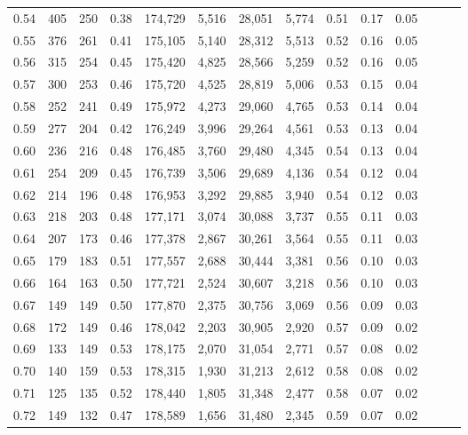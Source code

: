 \begin{tabular}{rrrrrrrrrrrrrr}
0.54 &    405 &  250 &  0.38 &  174,729 &    5,516 &  28,051 &   5,774 &  0.51 &  0.17 &      0.05 \\
0.55 &    376 &  261 &  0.41 &  175,105 &    5,140 &  28,312 &   5,513 &  0.52 &  0.16 &      0.05 \\
0.56 &    315 &  254 &  0.45 &  175,420 &    4,825 &  28,566 &   5,259 &  0.52 &  0.16 &      0.05 \\
0.57 &    300 &  253 &  0.46 &  175,720 &    4,525 &  28,819 &   5,006 &  0.53 &  0.15 &      0.04 \\
0.58 &    252 &  241 &  0.49 &  175,972 &    4,273 &  29,060 &   4,765 &  0.53 &  0.14 &      0.04 \\
0.59 &    277 &  204 &  0.42 &  176,249 &    3,996 &  29,264 &   4,561 &  0.53 &  0.13 &      0.04 \\
0.60 &    236 &  216 &  0.48 &  176,485 &    3,760 &  29,480 &   4,345 &  0.54 &  0.13 &      0.04 \\
0.61 &    254 &  209 &  0.45 &  176,739 &    3,506 &  29,689 &   4,136 &  0.54 &  0.12 &      0.04 \\
0.62 &    214 &  196 &  0.48 &  176,953 &    3,292 &  29,885 &   3,940 &  0.54 &  0.12 &      0.03 \\
0.63 &    218 &  203 &  0.48 &  177,171 &    3,074 &  30,088 &   3,737 &  0.55 &  0.11 &      0.03 \\
0.64 &    207 &  173 &  0.46 &  177,378 &    2,867 &  30,261 &   3,564 &  0.55 &  0.11 &      0.03 \\
0.65 &    179 &  183 &  0.51 &  177,557 &    2,688 &  30,444 &   3,381 &  0.56 &  0.10 &      0.03 \\
0.66 &    164 &  163 &  0.50 &  177,721 &    2,524 &  30,607 &   3,218 &  0.56 &  0.10 &      0.03 \\
0.67 &    149 &  149 &  0.50 &  177,870 &    2,375 &  30,756 &   3,069 &  0.56 &  0.09 &      0.03 \\
0.68 &    172 &  149 &  0.46 &  178,042 &    2,203 &  30,905 &   2,920 &  0.57 &  0.09 &      0.02 \\
0.69 &    133 &  149 &  0.53 &  178,175 &    2,070 &  31,054 &   2,771 &  0.57 &  0.08 &      0.02 \\
0.70 &    140 &  159 &  0.53 &  178,315 &    1,930 &  31,213 &   2,612 &  0.58 &  0.08 &      0.02 \\
0.71 &    125 &  135 &  0.52 &  178,440 &    1,805 &  31,348 &   2,477 &  0.58 &  0.07 &      0.02 \\
0.72 &    149 &  132 &  0.47 &  178,589 &    1,656 &  31,480 &   2,345 &  0.59 &  0.07 &      0.02 \\

\end{tabular}
